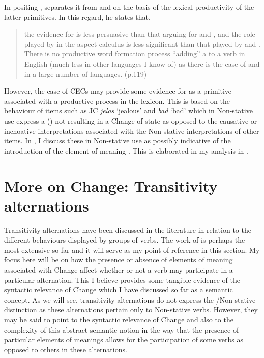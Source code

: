 In positing \DO, \citet{Dowty1979} separates it from \CAUSE and \BECOME
on the basis of the lexical productivity of the latter primitives. In
this regard, he states that,

\begin{quote}
the evidence for \DO is less persuasive than that arguing for \CAUSE and
\BECOME, and the role played by \DO in the aspect calculus is less
significant than that played by \CAUSE and \BECOME. There is no
productive word formation process “adding” a \DO to a verb in English
(much less in other languages I know of) as there is the case of \CAUSE
and \BECOME in a large number of languages. (p.119)
\end{quote}

However, the case of CECs  may provide some
evidence for \DO as a primitive associated with a productive process in
the lexicon. This is based on the behaviour of items such as JC
\textit{jelas} `jealous' and \textit{bad} `bad' which in Non-stative
use express a  () not resulting in a Change of state as
opposed to the causative or inchoative interpretations associated with
the Non-stative interpretations of other items.  In , I
discuss these in Non-stative use as possibly indicative of the
introduction of the element of meaning \DO. This is elaborated in my
analysis in .

\section{More on Change: Transitivity alternations}\label{sec:4.4}

Transitivity alternations have been discussed in the literature in
relation to the different behaviours displayed by groups of verbs.
The work of \citet{Levin1993} is perhaps the most extensive so far and
it will serve as my point of reference in this section.  My focus here
will be on how the presence or absence of elements of meaning
associated with Change affect whether or not a verb may participate in
a particular alternation.  This I believe provides some tangible
evidence of the syntactic relevance of Change which I have discussed
so far as a semantic concept.  As we will see, transitivity
alternations do not express the \slash Non-stative distinction as
these alternations pertain only to Non-stative verbs.  However, they
may be said to point to the syntactic relevance of Change and also to
the complexity of this abstract semantic notion in the way that the
presence of particular elements of meanings allows for the
participation of some verbs as opposed to others in these
alternations.

